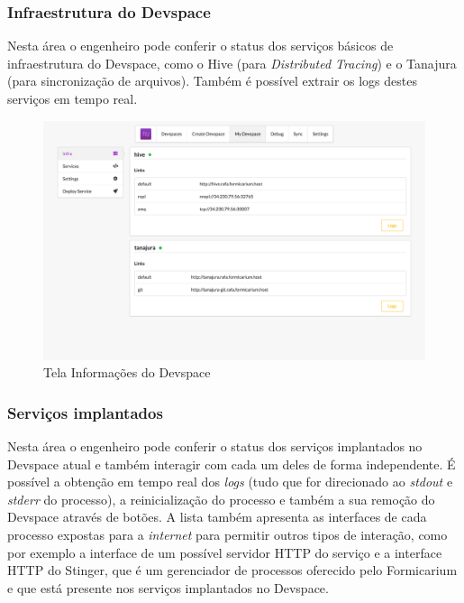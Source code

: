     
        \subsubsection{Infraestrutura do Devspace}
        Nesta área o engenheiro pode conferir o status dos serviços básicos de infraestrutura do Devspace, como o Hive (para \textit{Distributed Tracing}) e o Tanajura (para sincronização de arquivos). Também é possível extrair os logs destes serviços em tempo real.
    
        \begin{figure}[htb]
        	\caption{\label{fig_frontend_devspace_info}Tela Informações do Devspace}
        	\begin{center}
        	\includegraphics[width=\textwidth,keepaspectratio]{pictures/frontend/frontend-devspace-info.png}
        	\end{center}
        \end{figure}
        
        \subsubsection{Serviços implantados}
        
        Nesta área o engenheiro pode conferir o status dos serviços implantados no Devspace atual e também interagir com cada um deles de forma independente. É possível a obtenção em tempo real dos \textit{logs} (tudo que for direcionado ao \textit{stdout} e \textit{stderr} do processo), a reinicialização do processo e também a sua remoção do Devspace através de botões. A lista também apresenta as interfaces de cada processo expostas para a \textit{internet} para permitir outros tipos de interação, como por exemplo a interface de um possível servidor HTTP do serviço e a interface HTTP do Stinger, que é um gerenciador de processos oferecido pelo Formicarium e que está presente nos serviços implantados no Devspace.
        
